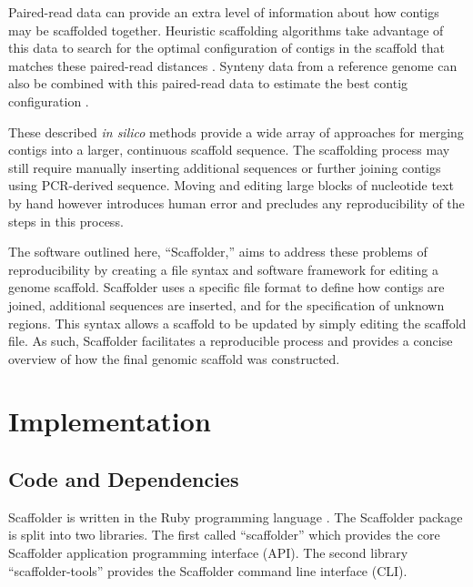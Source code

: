 \documentclass[10pt]{bmc_article}
\newenvironment{bmcformat}{\begin{raggedright}\baselineskip20pt\sloppy\setboolean{publ}{false}}{\end{raggedright}\baselineskip20pt\sloppy}
\begin{document}
\begin{bmcformat}
Paired-read data can provide an extra level of information about how contigs
may be scaffolded together. Heuristic scaffolding algorithms take advantage of
this data to search for the optimal configuration of contigs in the scaffold
that matches these paired-read distances \cite{dayarian2010,boetzer2011}.
Synteny data from a reference genome can also be combined with this
paired-read data to estimate the best contig configuration \cite{pop2004}. \pb

These described \emph{in silico} methods provide a wide array of approaches for
merging contigs into a larger, continuous scaffold sequence.
 The scaffolding process may still require manually
inserting additional sequences or further joining contigs using PCR-derived
sequence. Moving and editing large blocks of nucleotide text by hand however
 introduces human error and precludes any reproducibility of
the steps in this process. \pb

The software outlined here, ``Scaffolder,'' aims to address these problems of
reproducibility by creating a file syntax and software framework for editing
a genome scaffold. Scaffolder uses a specific file format to define how
contigs are joined, additional sequences are inserted, and for the
specification of unknown regions. This syntax allows a scaffold to be updated
by simply editing the scaffold file. As such, Scaffolder facilitates
a reproducible  process and provides a concise
overview of how the final genomic scaffold was constructed. \pb

\clearpage

\section*{Implementation} %

\subsection*{Code and Dependencies} %

Scaffolder is written in the Ruby programming language  \cite{ruby-lang}. The
Scaffolder package is split into two libraries. The first called ``scaffolder''
which provides the core Scaffolder application programming interface (API). The
second library ``scaffolder-tools'' provides the Scaffolder command line
interface (CLI). \pb


\end{bmcformat}
\end{document}
